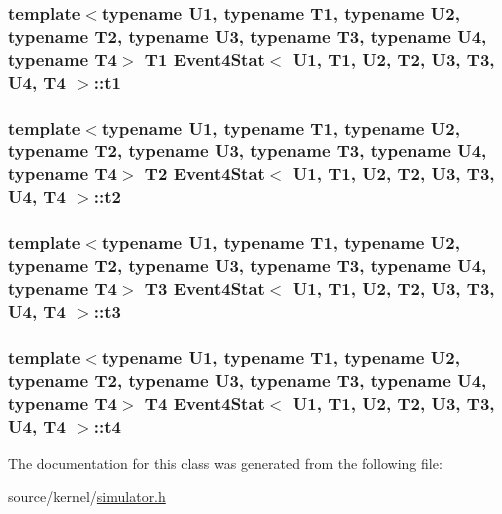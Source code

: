 \hypertarget{classEvent4Stat_82b1a4255a770e482d4aa975713b5150}{
\subsubsection[{t1}]{\setlength{\rightskip}{0pt plus 5cm}template$<$typename U1, typename T1, typename U2, typename T2, typename U3, typename T3, typename U4, typename T4$>$ T1 {\bf Event4Stat}$<$ U1, T1, U2, T2, U3, T3, U4, T4 $>$::{\bf t1}}}
\label{classEvent4Stat_82b1a4255a770e482d4aa975713b5150}


\hypertarget{classEvent4Stat_aaa8d8169956ad7f816594902579fa52}{
\subsubsection[{t2}]{\setlength{\rightskip}{0pt plus 5cm}template$<$typename U1, typename T1, typename U2, typename T2, typename U3, typename T3, typename U4, typename T4$>$ T2 {\bf Event4Stat}$<$ U1, T1, U2, T2, U3, T3, U4, T4 $>$::{\bf t2}}}
\label{classEvent4Stat_aaa8d8169956ad7f816594902579fa52}


\hypertarget{classEvent4Stat_0cb1a5a34eac05d95539aaae5dba162d}{
\subsubsection[{t3}]{\setlength{\rightskip}{0pt plus 5cm}template$<$typename U1, typename T1, typename U2, typename T2, typename U3, typename T3, typename U4, typename T4$>$ T3 {\bf Event4Stat}$<$ U1, T1, U2, T2, U3, T3, U4, T4 $>$::{\bf t3}}}
\label{classEvent4Stat_0cb1a5a34eac05d95539aaae5dba162d}


\hypertarget{classEvent4Stat_4812a9e029fb2e460a2bebdf253d7c7d}{
\subsubsection[{t4}]{\setlength{\rightskip}{0pt plus 5cm}template$<$typename U1, typename T1, typename U2, typename T2, typename U3, typename T3, typename U4, typename T4$>$ T4 {\bf Event4Stat}$<$ U1, T1, U2, T2, U3, T3, U4, T4 $>$::{\bf t4}}}
\label{classEvent4Stat_4812a9e029fb2e460a2bebdf253d7c7d}




The documentation for this class was generated from the following file:\begin{CompactItemize}
\item 
source/kernel/\hyperlink{simulator_8h}{simulator.h}\end{CompactItemize}
